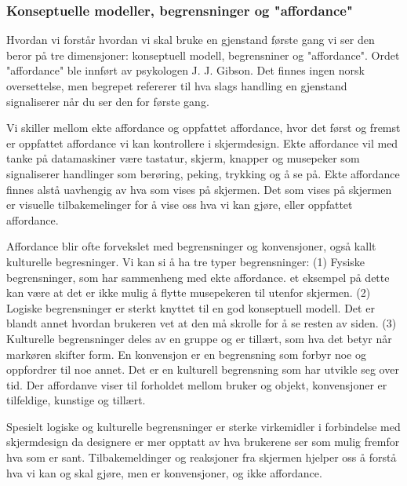 \subsubsection{Konseptuelle modeller, begrensninger og "affordance"}

Hvordan vi forstår hvordan vi skal bruke en gjenstand første gang vi ser den beror på tre dimensjoner: konseptuell modell, begrensniner og "affordance". Ordet "affordance" ble innført av psykologen J. J. Gibson. Det finnes ingen norsk oversettelse, men begrepet refererer til hva slags handling en gjenstand signaliserer når du ser den for første gang.\cite{Norman99}

\noindent
Vi skiller mellom ekte affordance og oppfattet affordance, hvor det først og fremst er oppfattet affordance vi kan kontrollere i skjermdesign. Ekte affordance vil med tanke på datamaskiner være tastatur, skjerm, knapper og musepeker som signaliserer handlinger som berøring, peking, trykking og å se på. Ekte affordance finnes alstå uavhengig av hva som vises på skjermen. Det som vises på skjermen er visuelle tilbakemelinger for å vise oss hva vi kan gjøre, eller oppfattet affordance.\cite{Norman99}

\noindent
Affordance blir ofte forvekslet med begrensninger og konvensjoner, også kallt kulturelle begresninger. Vi kan si å ha tre typer begrensninger: (1) Fysiske begrensninger, som har sammenheng med ekte affordance. et eksempel på dette kan være at det er ikke mulig å flytte musepekeren til utenfor skjermen. (2) Logiske begrensninger er sterkt knyttet til en god konseptuell modell. Det er blandt annet hvordan brukeren vet at den må skrolle for å se resten av siden. (3) Kulturelle begrensninger deles av en gruppe og er tillært, som hva det betyr når markøren skifter form. En konvensjon er en begrensning som forbyr noe og oppfordrer til noe annet. Det er en kulturell begrensning som har utvikle seg over tid. Der affordanve viser til forholdet mellom bruker og objekt, konvensjoner er tilfeldige, kunstige og tillært.\cite{Norman99}

\noindent
Spesielt logiske og kulturelle begrensninger er sterke virkemidler i forbindelse med skjermdesign da designere er mer opptatt av hva brukerene ser som mulig fremfor hva som er sant. Tilbakemeldinger og reaksjoner fra skjermen hjelper oss å forstå hva vi kan og skal gjøre, men er konvensjoner, og ikke affordance.\cite{Norman99}